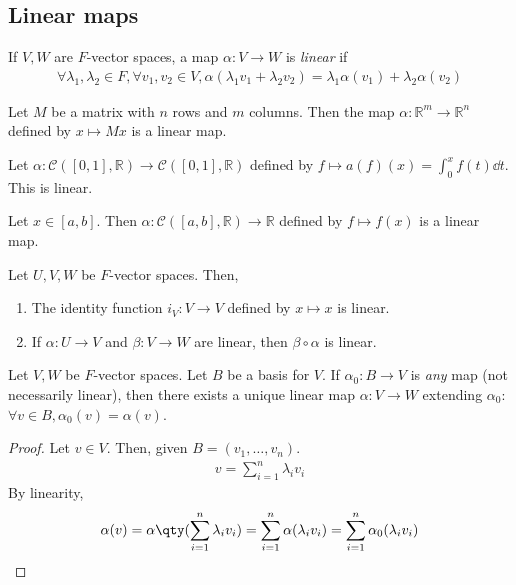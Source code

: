     \subsection{Linear maps}
    \begin{definition}
        If $V, W$ are $F$-vector spaces, a map $\alpha \colon V \to W$ is \textit{linear} if
        \begin{align*}
            \forall \lambda_1, \lambda_2 \in F, \forall v_1, v_2 \in V, \alpha(\lambda_1 v_1 + \lambda_2 v_2) = \lambda_1 \alpha(v_1) + \lambda_2 \alpha(v_2)
        \end{align*}
    \end{definition}
    \begin{example}
        Let $M$ be a matrix with $n$ rows and $m$ columns.
        Then the map $\alpha \colon \mathbb R^m \to \mathbb R^n$ defined by $x \mapsto M x$ is a linear map.
    \end{example}
    \begin{example}
        Let $\alpha \colon \mathcal C([0,1], \mathbb R) \to \mathcal C([0,1], \mathbb R)$ defined by $f \mapsto a(f)(x) = \int_0^x f(t) \dd{t}$.
        This is linear.
    \end{example}
    \begin{example}
        Let $x \in [a,b]$.
        Then $\alpha \colon \mathcal C([a,b], \mathbb R) \to \mathbb R$ defined by $f \mapsto f(x)$ is a linear map.
    \end{example}
    \begin{remark}
        Let $U, V, W$ be $F$-vector spaces.
        Then,
        \begin{enumerate}
            \item The identity function $i_V \colon V \to V$ defined by $x \mapsto x$ is linear.
            \item If $\alpha \colon U \to V$ and $\beta \colon V \to W$ are linear, then $\beta \circ \alpha$ is linear.
        \end{enumerate}
    \end{remark}
    \begin{lemma}
        Let $V, W$ be $F$-vector spaces.
        Let $B$ be a basis for $V$.
        If $\alpha_0 \colon B \to V$ is \textit{any} map (not necessarily linear), then there exists a unique linear map $\alpha \colon V \to W$ extending $\alpha_0$: $\forall v \in B, \alpha_0(v) = \alpha(v)$.
    \end{lemma}
    \begin{proof}
        Let $v \in V$.
        Then, given $B = (v_1, \dots, v_n)$.
        \begin{align*}
            v = \sum_{i=1}^n \lambda_i v_i
        \end{align*}
        By linearity,
        \begin{align*}
            \alpha(v) = \alpha\qty(\sum_{i=1}^n \lambda_i v_i) = \sum_{i=1}^n \alpha(\lambda_i v_i) = \sum_{i=1}^n \alpha_0(\lambda_i v_i)
        \end{align*}
    \end{proof}
